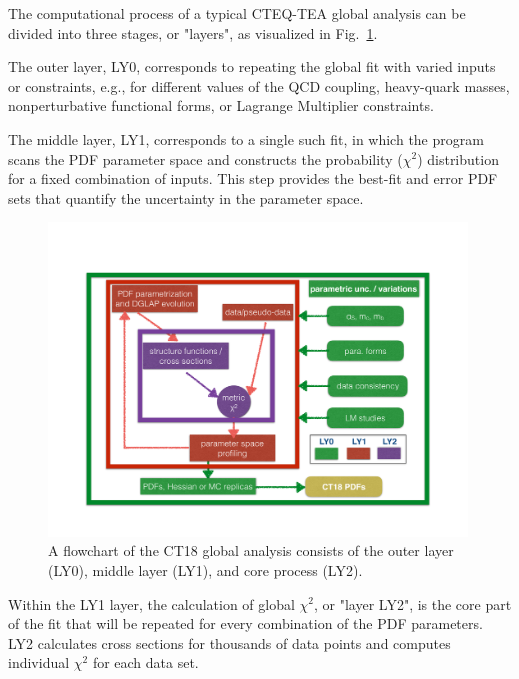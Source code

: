 %
The computational process of a typical CTEQ-TEA global analysis can be divided into three stages, or "layers", as visualized in Fig.~\ref{fig:gfit}.

%
The outer layer, LY0, corresponds to repeating the global fit with varied inputs or
constraints, e.g., for different values of the QCD coupling, heavy-quark masses, nonperturbative functional forms, or Lagrange Multiplier constraints.

%
The middle layer, LY1, corresponds to a single such fit, in which the program scans the PDF parameter space and constructs the probability ($\chi^2$) distribution for a fixed combination of inputs.
%
This step provides the best-fit and error PDF sets that quantify the uncertainty in the parameter space.

\begin{figure}[tb]
	\begin{center}
		\includegraphics[width=0.99\textwidth]{./fig/CT18code.pdf}
	\end{center}
	\vspace{-2ex}
	\caption{\label{fig:gfit}
		A flowchart of the CT18 global analysis consists of the outer layer (LY0),
		middle layer (LY1), and core process (LY2).
	}
\end{figure}

%
Within the LY1 layer, the calculation of global $\chi^2$, or "layer LY2", is the core part of the fit that will
be repeated for every combination of the PDF parameters.
%
LY2 calculates cross sections for thousands of data points and computes individual $\chi^2$ for each data set. 


